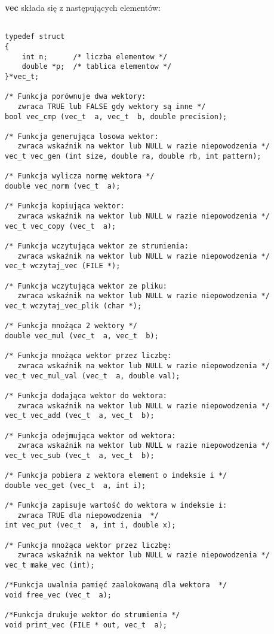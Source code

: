 \documentclass[bibtotocnumbered, headsepline,normalheadings,12pt,polish]{scrreprt}
\begin{document}
\textbf{vec} składa się z następujących elementów:
\small
\begin{verbatim}

typedef struct
{
    int n;      /* liczba elementow */
    double *p;  /* tablica elementow */
}*vec_t;

/* Funkcja porównuje dwa wektory: 
   zwraca TRUE lub FALSE gdy wektory są inne */
bool vec_cmp (vec_t  a, vec_t  b, double precision);

/* Funkcja generująca losowa wektor: 
   zwraca wskaźnik na wektor lub NULL w razie niepowodzenia */
vec_t vec_gen (int size, double ra, double rb, int pattern);

/* Funkcja wylicza normę wektora */
double vec_norm (vec_t  a);

/* Funkcja kopiująca wektor: 
   zwraca wskaźnik na wektor lub NULL w razie niepowodzenia */
vec_t vec_copy (vec_t  a);

/* Funkcja wczytująca wektor ze strumienia: 
   zwraca wskaźnik na wektor lub NULL w razie niepowodzenia */
vec_t wczytaj_vec (FILE *);

/* Funkcja wczytująca wektor ze pliku: 
   zwraca wskaźnik na wektor lub NULL w razie niepowodzenia */
vec_t wczytaj_vec_plik (char *);

/* Funkcja mnożąca 2 wektory */
double vec_mul (vec_t  a, vec_t  b);

/* Funkcja mnożąca wektor przez liczbę: 
   zwraca wskaźnik na wektor lub NULL w razie niepowodzenia */
vec_t vec_mul_val (vec_t  a, double val);

/* Funkcja dodająca wektor do wektora: 
   zwraca wskaźnik na wektor lub NULL w razie niepowodzenia */
vec_t vec_add (vec_t  a, vec_t  b);

/* Funkcja odejmująca wektor od wektora: 
   zwraca wskaźnik na wektor lub NULL w razie niepowodzenia */
vec_t vec_sub (vec_t  a, vec_t  b);

/* Funkcja pobiera z wektora element o indeksie i */
double vec_get (vec_t  a, int i);

/* Funkcja zapisuje wartość do wektora w indeksie i: 
   zwraca TRUE dla niepowodzenia  */
int vec_put (vec_t  a, int i, double x);

/* Funkcja mnożąca wektor przez liczbę: 
   zwraca wskaźnik na wektor lub NULL w razie niepowodzenia */
vec_t make_vec (int);

/*Funkcja uwalnia pamięć zaalokowaną dla wektora  */
void free_vec (vec_t  a);

/*Funkcja drukuje wektor do strumienia */
void print_vec (FILE * out, vec_t  a);
\end{verbatim}
\end{document}
